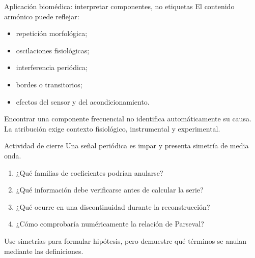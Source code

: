 \documentclass[
  ignorenonframetext,
  aspectratio=169,
  spanish,
  professionalfonts]{beamer}
\providecommand{\tightlist}{%
  \setlength{\itemsep}{0pt}\setlength{\parskip}{0pt}}
\begin{document}
\begin{frame}{Aplicación biomédica: interpretar componentes, no
etiquetas}
\protect{}\label{aplicaciuxf3n-biomuxe9dica-interpretar-componentes-no-etiquetas}
El contenido armónico puede reflejar:

\begin{itemize}
\tightlist
\item
  repetición morfológica;
\item
  oscilaciones fisiológicas;
\item
  interferencia periódica;
\item
  bordes o transitorios;
\item
  efectos del sensor y del acondicionamiento.
\end{itemize}

\begin{tcolorbox}[enhanced jigsaw, arc=.35mm, bottomrule=.15mm, bottomtitle=1mm, breakable, colback=white, colbacktitle=quarto-callout-caution-color!10!white, colframe=quarto-callout-caution-color-frame, coltitle=black, left=2mm, leftrule=.75mm, opacityback=0, opacitybacktitle=0.6, rightrule=.15mm, title={Razonamiento crítico}, titlerule=0mm, toprule=.15mm, toptitle=1mm]

Encontrar una componente frecuencial no identifica automáticamente su
causa. La atribución exige contexto fisiológico, instrumental y
experimental.

\end{tcolorbox}
\end{frame}

\begin{frame}{Actividad de cierre}
\protect{}\label{actividad-de-cierre}
Una señal periódica es impar y presenta simetría de media onda.

\begin{enumerate}
\tightlist
\item
  ¿Qué familias de coeficientes podrían anularse?
\item
  ¿Qué información debe verificarse antes de calcular la serie?
\item
  ¿Qué ocurre en una discontinuidad durante la reconstrucción?
\item
  ¿Cómo comprobaría numéricamente la relación de Parseval?
\end{enumerate}

\begin{tcolorbox}[enhanced jigsaw, arc=.35mm, bottomrule=.15mm, bottomtitle=1mm, breakable, colback=white, colbacktitle=quarto-callout-tip-color!10!white, colframe=quarto-callout-tip-color-frame, coltitle=black, left=2mm, leftrule=.75mm, opacityback=0, opacitybacktitle=0.6, rightrule=.15mm, title={Criterio de respuesta}, titlerule=0mm, toprule=.15mm, toptitle=1mm]

Use simetrías para formular hipótesis, pero demuestre qué términos se
anulan mediante las definiciones.

\end{tcolorbox}
\end{frame}
\end{document}
